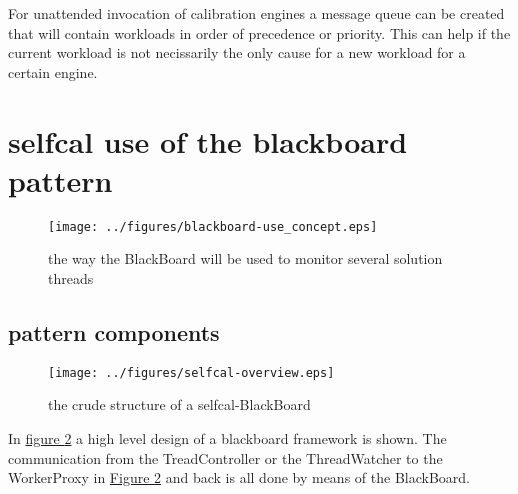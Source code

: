 \documentclass[]{lofar}
\begin{document}
    For unattended invocation of calibration engines a message queue
    can be created that will contain workloads in order of precedence
    or priority. This can help if the current workload is not
    necissarily the only cause for a new workload for a certain
    engine.

  \section{selfcal use of the blackboard pattern}
  \label{sec:selfcal-use-blackboard}
  \begin{figure}
    \texttt{[image: ../figures/blackboard-use\_concept.eps]}
    \hypertarget{fig:blackboard-use}{}
    \caption{the way the BlackBoard will be used to monitor several
    solution threads\label{fig:blackboard-use}}
  \end{figure}

    \subsection{pattern components}
    \label{subsec:pattern-components}

      \begin{figure}
        \texttt{[image: ../figures/selfcal-overview.eps]}
        \hypertarget{fig:selfcal-overview}{}
        \caption{the crude structure of a selfcal-BlackBoard\label{fig:selfcal-overview}}
      \end{figure}

      In \hyperlink{fig:selfcal-overview}{figure \ref{fig:selfcal-overview}} a high
      level design of a blackboard framework is shown. The
      communication from the TreadController or the ThreadWatcher to
      the WorkerProxy in \hyperlink{fig:selfcal-overview}{Figure
      \ref{fig:selfcal-overview}} and back is all done by means of the
      BlackBoard.
\end{document}
